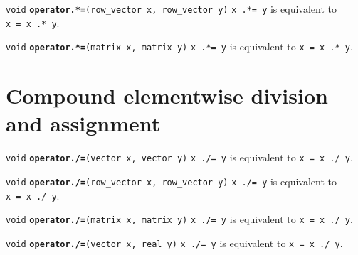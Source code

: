 \documentclass[
  10pt,
]{book}
\begin{document}
\texttt{void} \textbf{\texttt{operator.*=}}\texttt{(row\_vector\ x,\ row\_vector\ y)}\newline
\texttt{x\ .*=\ y} is equivalent to \texttt{x\ =\ x\ .*\ y}.


\texttt{void} \textbf{\texttt{operator.*=}}\texttt{(matrix\ x,\ matrix\ y)}\newline
\texttt{x\ .*=\ y} is equivalent to \texttt{x\ =\ x\ .*\ y}.

\hypertarget{compound-elementwise-division-and-assignment}{%
\section{Compound elementwise division and assignment}\label{compound-elementwise-division-and-assignment}}


\texttt{void} \textbf{\texttt{operator./=}}\texttt{(vector\ x,\ vector\ y)}\newline
\texttt{x\ ./=\ y} is equivalent to \texttt{x\ =\ x\ ./\ y}.


\texttt{void} \textbf{\texttt{operator./=}}\texttt{(row\_vector\ x,\ row\_vector\ y)}\newline
\texttt{x\ ./=\ y} is equivalent to \texttt{x\ =\ x\ ./\ y}.


\texttt{void} \textbf{\texttt{operator./=}}\texttt{(matrix\ x,\ matrix\ y)}\newline
\texttt{x\ ./=\ y} is equivalent to \texttt{x\ =\ x\ ./\ y}.


\texttt{void} \textbf{\texttt{operator./=}}\texttt{(vector\ x,\ real\ y)}\newline
\texttt{x\ ./=\ y} is equivalent to \texttt{x\ =\ x\ ./\ y}.

\end{document}
